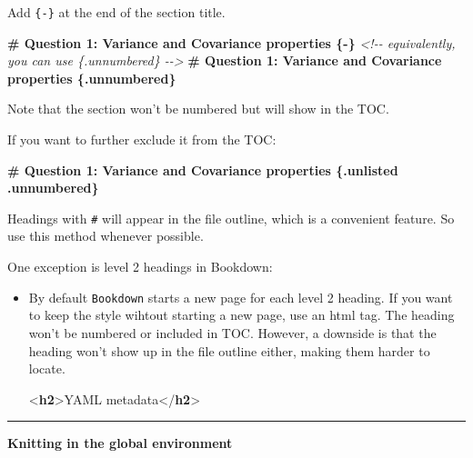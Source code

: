 \documentclass[
]{book}
\newenvironment{Shaded}{\begin{snugshade}}{\end{snugshade}}
\newcommand{\CommentTok}[1]{\textcolor[rgb]{0.56,0.35,0.01}{\textit{#1}}}
\newcommand{\DataTypeTok}[1]{\textcolor[rgb]{0.13,0.29,0.53}{#1}}
\newcommand{\FunctionTok}[1]{\textcolor[rgb]{0.13,0.29,0.53}{\textbf{#1}}}
\newcommand{\KeywordTok}[1]{\textcolor[rgb]{0.13,0.29,0.53}{\textbf{#1}}}
\newcommand{\NormalTok}[1]{#1}
\theoremstyle{definition}
\theoremstyle{definition}
\theoremstyle{definition}
\theoremstyle{definition}
\theoremstyle{remark}
\begin{document}
Add \texttt{\{-\}} at the end of the section title.

\begin{Shaded}
\begin{Highlighting}[]
\FunctionTok{\# Question 1: Variance and Covariance properties \{{-}\}}
\CommentTok{\textless{}!{-}{-} equivalently, you can use \{.unnumbered\} {-}{-}\textgreater{}} 
\FunctionTok{\# Question 1: Variance and Covariance properties \{.unnumbered\}}
\end{Highlighting}
\end{Shaded}

Note that the section won't be numbered but will show in the TOC.

If you want to further exclude it from the TOC:

\begin{Shaded}
\begin{Highlighting}[]
\FunctionTok{\# Question 1: Variance and Covariance properties \{.unlisted .unnumbered\}}
\end{Highlighting}
\end{Shaded}

Headings with \texttt{\#} will appear in the file outline, which is a convenient feature. So use this method whenever possible.

One exception is level 2 headings in Bookdown:

\begin{itemize}
\item
  By default \texttt{Bookdown} starts a new page for each level 2 heading. If you want to keep the style wihtout starting a new page, use an html tag. The heading won't be numbered or included in TOC. However, a downside is that the heading won't show up in the file outline either, making them harder to locate.

\begin{Shaded}
\begin{Highlighting}[]
\DataTypeTok{\textless{}}\KeywordTok{h2}\DataTypeTok{\textgreater{}}\NormalTok{YAML metadata}\DataTypeTok{\textless{}/}\KeywordTok{h2}\DataTypeTok{\textgreater{}}
\end{Highlighting}
\end{Shaded}
\end{itemize}

\begin{center}\rule{0.5\linewidth}{0.5pt}\end{center}

\textbf{Knitting in the global environment}
\end{document}
